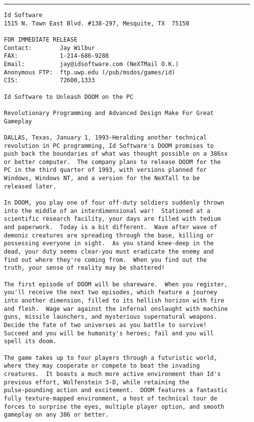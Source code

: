\label{label_pressrelease}
\hrule \par \bigskip
\begin{verbatim}
Id Software
1515 N. Town East Blvd. #138-297, Mesquite, TX  75150

FOR IMMEDIATE RELEASE
Contact:        Jay Wilbur
FAX:            1-214-686-9288
Email:          jay@idsoftware.com (NeXTMail O.K.)
Anonymous FTP:  ftp.uwp.edu (/pub/msdos/games/id)
CIS:            72600,1333

Id Software to Unleash DOOM on the PC

Revolutionary Programming and Advanced Design Make For Great
Gameplay

DALLAS, Texas, January 1, 1993-Heralding another technical
revolution in PC programming, Id Software's DOOM promises to
push back the boundaries of what was thought possible on a 386sx
or better computer.  The company plans to release DOOM for the
PC in the third quarter of 1993, with versions planned for 
Windows, Windows NT, and a version for the NeXTall to be
released later.

In DOOM, you play one of four off-duty soldiers suddenly thrown
into the middle of an interdimensional war!  Stationed at a
scientific research facility, your days are filled with tedium
and paperwork.  Today is a bit different.  Wave after wave of
demonic creatures are spreading through the base, killing or
possessing everyone in sight.  As you stand knee-deep in the
dead, your duty seems clear-you must eradicate the enemy and
find out where they're coming from.  When you find out the
truth, your sense of reality may be shattered!

The first episode of DOOM will be shareware.  When you register,
you'll receive the next two episodes, which feature a journey
into another dimension, filled to its hellish horizon with fire
and flesh.  Wage war against the infernal onslaught with machine
guns, missile launchers, and mysterious supernatural weapons. 
Decide the fate of two universes as you battle to survive! 
Succeed and you will be humanity's heroes; fail and you will
spell its doom.

The game takes up to four players through a futuristic world,
where they may cooperate or compete to beat the invading
creatures.  It boasts a much more active environment than Id's
previous effort, Wolfenstein 3-D, while retaining the
pulse-pounding action and excitement.  DOOM features a fantastic
fully texture-mapped environment, a host of technical tour de
forces to surprise the eyes, multiple player option, and smooth
gameplay on any 386 or better.


\end{verbatim}
